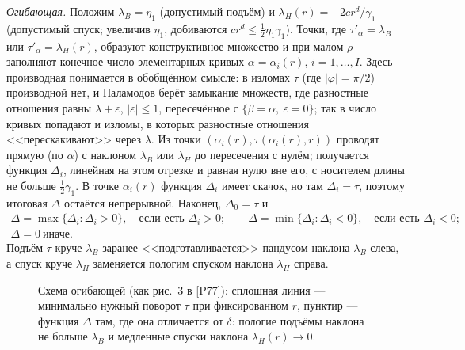 \documentclass[11pt,a4paper]{article}
\theoremstyle{definition}
\newcommand{\eps}{\varepsilon}
\begin{document}
\emph{Огибающая.} Положим $\lambda_B=\eta_1$ (допустимый подъём) и $\lambda_H(r)=-2cr^d/\gamma_1$
(допустимый спуск; увеличив $\eta_1$, добиваются $cr^d\le\frac12\eta_1\gamma_1$). Точки, где
$\tau'_\alpha=\lambda_B$ или $\tau'_\alpha=\lambda_H(r)$, образуют конструктивное множество и при
малом $\rho$ заполняют конечное число элементарных кривых $\alpha=\alpha_i(r)$, $i=1,\dots,I$. Здесь
производная понимается в обобщённом смысле: в изломах $\tau$ (где $|\varphi|=\pi/2$) производной нет,
и Паламодов берёт замыкание множеств, где разностные отношения равны $\lambda+\eps$, $|\eps|\le1$,
пересечённое с $\{\beta=\alpha,\ \eps=0\}$; так в число кривых попадают и изломы, в которых
разностные отношения <<перескакивают>> через $\lambda$. Из точки $(\alpha_i(r),\tau(\alpha_i(r),r))$ проводят
прямую (по $\alpha$) с наклоном $\lambda_B$ или $\lambda_H$ до пересечения с нулём; получается функция
$\Delta_i$, линейная на этом отрезке и равная нулю вне его, с носителем длины не больше
$\frac12\gamma_1$. В точке $\alpha_i(r)$ функция $\Delta_i$ имеет скачок, но там $\Delta_i=\tau$, поэтому
итоговая $\Delta$ остаётся непрерывной. Наконец, $\Delta_0=\tau$ и
\begin{gather*}
\Delta=\max\{\Delta_i:\Delta_i>0\},\quad\text{если есть }\Delta_i>0;\qquad
\Delta=\min\{\Delta_i:\Delta_i<0\},\quad\text{если есть }\Delta_i<0;\\
\Delta=0\ \text{иначе}.
\end{gather*}
Подъём $\tau$ круче $\lambda_B$ заранее <<подготавливается>> пандусом наклона $\lambda_B$ слева, а
спуск круче $\lambda_H$ заменяется пологим спуском наклона $\lambda_H$ справа.

\begin{figure}[ht]
\centering
{}
\caption{Схема огибающей (как рис.~3 в [P77]): сплошная линия --- минимально нужный поворот
$\tau$ при фиксированном $r$, пунктир --- функция $\Delta$ там, где она отличается от $\delta$:
пологие подъёмы наклона не больше $\lambda_B$ и медленные спуски наклона $\lambda_H(r)\to0$.}
\label{fig:envelope}
\end{figure}
\end{document}
